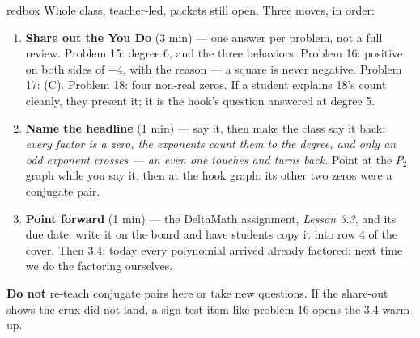 \documentclass[10pt]{article}
\begin{document}
\boxguard[20]
\begin{skillbox}{redbox}
Whole class, teacher-led, packets still open. Three moves, in order:
\begin{enumerate}[itemsep=3pt]
  \item \textbf{Share out the You Do} (3 min) --- one answer per problem, not a full review.
        Problem 15: degree 6, and the three behaviors. Problem 16: positive on both sides of
        $-4$, with the reason --- a square is never negative. Problem 17: (C). Problem 18: four
        non-real zeros. If a student explains 18's count cleanly, they present it; it is the
        hook's question answered at degree 5.
  \item \textbf{Name the headline} (1 min) --- say it, then make the class say it back:
        \textit{every factor is a zero, the exponents count them to the degree, and only an odd
        exponent crosses --- an even one touches and turns back.} Point at the $P_2$ graph
        while you say it, then at the hook graph: its other two zeros were a conjugate pair.
  \item \textbf{Point forward} (1 min) --- the DeltaMath assignment, \textit{Lesson 3.3}, and
        its due date: write it on the board and have students copy it into row 4 of the
        cover. Then 3.4: today every polynomial arrived already factored; next time we do the
        factoring ourselves.
\end{enumerate}
\textbf{Do not} re-teach conjugate pairs here or take new questions. If the share-out shows
the crux did not land, a sign-test item like problem 16 opens the 3.4 warm-up.
\end{skillbox}
\end{document}
